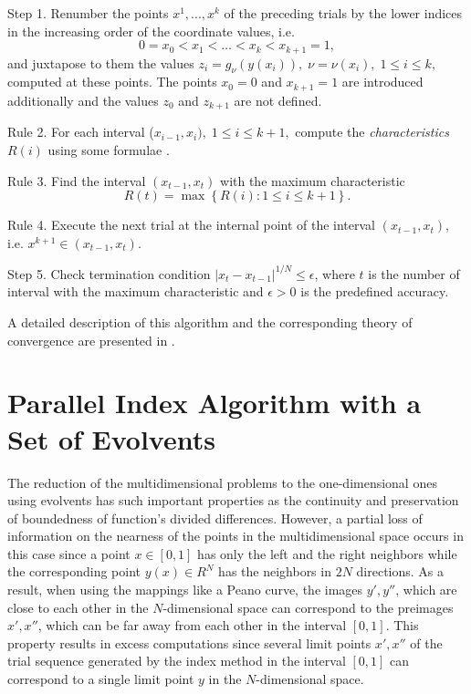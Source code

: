 \documentclass[smallextended]{svjour3}       %
\begin{document}
Step 1. Renumber the points $x^1,...,x^k$ of the preceding trials by the lower indices in the increasing order of the coordinate values, i.e.
\[
0=x_0<x_1<\dots <x_k<x_{k+1}=1,
\]
and juxtapose to them the values $z_i=g_\nu(y(x_i)), \; \nu=\nu(x_i), \; 1 \leq i \leq k,$ computed at these points. The points $x_0=0$ and $x_{k+1}=1$ are introduced additionally and the values $z_0$ and $z_{k+1}$ are not defined.

Rule 2. For each interval ($x_{i-1},x_i), \; 1 \leq i \leq k+1,$ compute the \textit{characteristics} $R(i)$ using some formulae \cite{Barkalov2002}.

Rule 3. Find the interval $(x_{t-1},x_t)$ with the maximum characteristic
\begin{equation}\label{MaxR}
R(t)=\max{\left\{R(i): 1 \leq i \leq k+1\right\}}.
\end{equation}

Rule 4. Execute the next trial at the internal point of the interval $(x_{t-1},x_t)$, i.e. $x^{k+1} \in (x_{t-1},x_t)$.

Step 5. Check termination condition $\left|x_t-x_{t-1}\right|^{1/N}\leq \epsilon$, where $t$ is the number of interval with the maximum characteristic and $\epsilon > 0$ is the predefined accuracy.

A detailed description of this algorithm and the corresponding theory of convergence are presented in \cite{Strongin2000,Sergeyev2001,Barkalov2002}.


\section{Parallel Index Algorithm with a Set of Evolvents}
\label{sec:3}

The reduction of the multidimensional problems to the one-dimensional ones using evolvents has such important properties as the continuity and preservation of boundedness of function's divided differences. However, a partial loss of information on the nearness of the points in the multidimensional space occurs in this case since a point $x \in [0,1]$ has only the left and the right neighbors while the corresponding point $y(x) \in R^N$ has the neighbors in $2N$ directions. As a result, when using the mappings like a Peano curve, the images $y', y''$, which are close to each other in the $N$-dimensional space can correspond to the preimages $x', x''$, which can be far away from each other in the interval $[0,1]$. This property results in excess computations since several limit points $x', x''$ of the trial sequence generated by the index method in the interval $[0,1]$ can correspond to a single limit point $y$ in the $N$-dimensional space.
\end{document}
